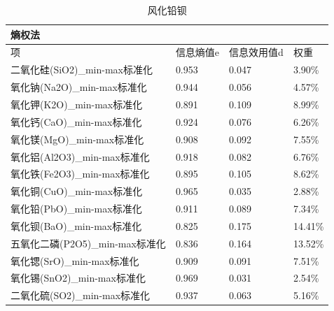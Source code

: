 \documentclass[UTF8]{ctexart}
\begin{document}
\begin{table}[H]
    \centering
    \caption{风化铅钡}
    \begin{tabular}{|l|l|l|l|}
        \hline
        熵权法                          & ~         & ~           & ~       \\ \hline
        项                              & 信息熵值e & 信息效用值d & 权重    \\ \hline
        二氧化硅(SiO2)\_min-max标准化   & 0.953     & 0.047       & 3.90\%  \\ \hline
        氧化钠(Na2O)\_min-max标准化     & 0.944     & 0.056       & 4.57\%  \\ \hline
        氧化钾(K2O)\_min-max标准化      & 0.891     & 0.109       & 8.99\%  \\ \hline
        氧化钙(CaO)\_min-max标准化      & 0.924     & 0.076       & 6.26\%  \\ \hline
        氧化镁(MgO)\_min-max标准化      & 0.908     & 0.092       & 7.55\%  \\ \hline
        氧化铝(Al2O3)\_min-max标准化    & 0.918     & 0.082       & 6.76\%  \\ \hline
        氧化铁(Fe2O3)\_min-max标准化    & 0.895     & 0.105       & 8.62\%  \\ \hline
        氧化铜(CuO)\_min-max标准化      & 0.965     & 0.035       & 2.88\%  \\ \hline
        氧化铅(PbO)\_min-max标准化      & 0.911     & 0.089       & 7.34\%  \\ \hline
        氧化钡(BaO)\_min-max标准化      & 0.825     & 0.175       & 14.41\% \\ \hline
        五氧化二磷(P2O5)\_min-max标准化 & 0.836     & 0.164       & 13.52\% \\ \hline
        氧化锶(SrO)\_min-max标准化      & 0.909     & 0.091       & 7.51\%  \\ \hline
        氧化锡(SnO2)\_min-max标准化     & 0.969     & 0.031       & 2.54\%  \\ \hline
        二氧化硫(SO2)\_min-max标准化    & 0.937     & 0.063       & 5.16\%  \\ \hline
    \end{tabular}
\end{table}
\end{document}
